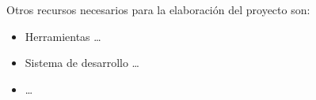 Otros recursos necesarios para la elaboración del proyecto son:

\begin{itemize}
\item Herramientas  \ldots
\item Sistema de desarrollo  \ldots
\item  \ldots
\end{itemize}




% 








